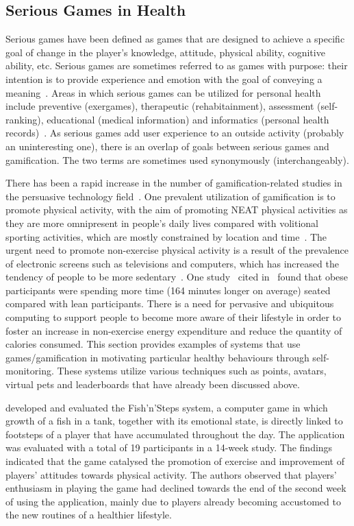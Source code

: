 \subsection{Serious Games in Health}
Serious games have been defined as games that are designed to achieve a specific goal of change in the player's knowledge, attitude, physical ability, cognitive ability, etc. Serious games are sometimes referred to as games with purpose: their intention is to provide experience and emotion with the goal of conveying a meaning~\citep{marsh2011serious}. Areas in which serious games can be utilized for personal health include preventive (exergames), therapeutic (rehabitainment), assessment (self-ranking), educational (medical information) and informatics (personal health records)~\citep{mccallum2012gamification}. As serious games add user experience to an outside activity (probably an uninteresting one), there is an overlap of goals between serious games and gamification. The two terms are sometimes used synonymously (interchangeably).

There has been a rapid increase in the number of gamification-related studies in the persuasive technology field~\citep{hamari2014persuasive}. One prevalent utilization of gamification is to promote physical activity, with the aim of promoting NEAT physical activities as they are more omnipresent in people's daily lives compared with volitional sporting activities, which are mostly constrained by location and time~\citep{fujiki2008neat}. The urgent need to promote non-exercise physical activity is a result of the prevalence of electronic screens such as televisions and computers, which has increased the tendency of people to be more sedentary~\citep{berkovsky2010physical}. One study~\citep{levine2006non} cited in~\cite{fujiki2008neat} found that obese participants were spending more time (164 minutes longer on average) seated  compared with lean participants. There is a need for pervasive and ubiquitous computing to support people to become more aware of their lifestyle in order to foster an increase in non-exercise energy expenditure and reduce the quantity of calories consumed. This section provides examples of systems that use games/gamification in motivating particular healthy  behaviours through self-monitoring. These systems utilize various techniques such as points, avatars, virtual pets and leaderboards that have already been discussed above. 

\cite{lin2006:fish} developed and evaluated the Fish'n'Steps system, a computer game in which growth of a fish in a tank, together with its emotional state, is directly linked to footsteps of a player that have accumulated throughout the day. The application was evaluated with a total of 19 participants in a 14-week study. The findings indicated that the game catalysed the promotion of exercise and improvement of players’ attitudes towards physical activity. The authors observed that players' enthusiasm in playing the game had declined towards the end of the second week of using the application, mainly due to players already becoming accustomed to the new routines of a healthier lifestyle. 
  
